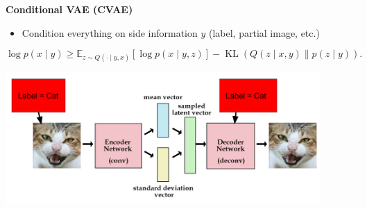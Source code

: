 \documentclass[portrait,fontscale=0.40,paperwidth=30in, paperheight=40in,margin=1in]{baposter} %
\theoremstyle{definition}
\theoremstyle{remark}
\newcommand{\op}[1]{\operatorname{#1}}
\newcommand{\E}{\mathbb{E}}
\newcommand{\compresslist}{ %
\setlength{\itemsep}{1pt}
\setlength{\parskip}{0pt}
\setlength{\parsep}{0pt}
}
\begin{document}
\begin{poster}
{\textbf{Conditional VAE (CVAE)} \cite{sohn2015learning}
\begin{itemize}\compresslist
\item Condition everything on side information $y$ (label, partial image, etc.)
\end{itemize}
\begin{scriptsize}
\begin{equation}
\log p(x \mid y)
\ge \E_{z \sim Q(\cdot \mid y,x)}[\log p(x \mid y,z)]
- \op{KL}(Q(z \mid x,y) \| p(z \mid y)).
\end{equation}
\end{scriptsize}

\begin{minipage}[b]{\textwidth}
\center
\includegraphics[width=0.9\textwidth]{images/cvae_simple.png}
\centering
\end{minipage}


}



\end{poster}
\end{document}
